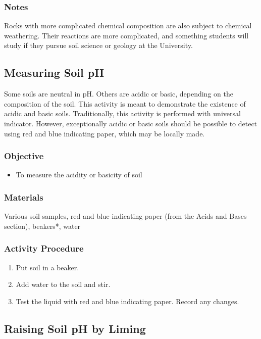 \subsubsection{Notes}
Rocks with more complicated chemical composition are also subject to chemical weathering. Their reactions are more complicated, and something students will study if they pursue soil science or geology at the University.

\subsection{Measuring Soil pH}

Some soils are neutral in pH. Others are acidic or basic, depending on the composition of the soil. This activity is meant to demonstrate the existence of acidic and basic soils. Traditionally, this activity is performed with universal indicator. However, exceptionally acidic or basic soils should be possible to detect using red and blue indicating paper, which may be locally made.

\subsubsection{Objective}
\begin{itemize}
\item{To measure the acidity or basicity of soil}
\end{itemize}

\subsubsection{Materials}
Various soil samples, red and blue indicating paper (from the Acids and Bases section), beakers*, water

\subsubsection{Activity Procedure}
\begin{enumerate}
\item{Put soil in a beaker.}
\item{Add water to the soil and stir.}
\item{Test the liquid with red and blue indicating paper. Record any changes.}
\end{enumerate}

\subsection{Raising Soil pH by Liming}

